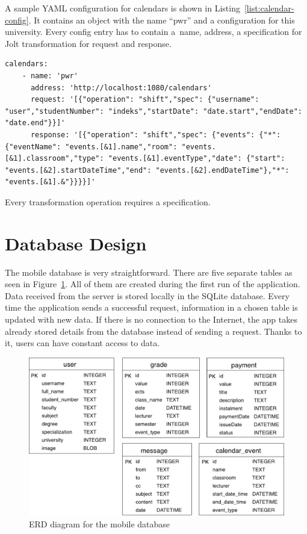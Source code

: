 A sample YAML configuration for calendars is shown in Listing~\ref{list:calendar-config}. It contains an object with the name ``pwr'' and a configuration for this university. Every config entry has to contain a~name, address, a specification for Jolt transformation for request and response.

\begin{lstlisting}[label=list:calendar-config,caption=Sample YAML configuration for calendars, basicstyle=\footnotesize\ttfamily, breaklines=true]
calendars:
    - name: 'pwr'
      address: 'http://localhost:1080/calendars'
      request: '[{"operation": "shift","spec": {"username": "user","studentNumber": "indeks","startDate": "date.start","endDate": "date.end"}}]'
      response: '[{"operation": "shift","spec": {"events": {"*": {"eventName": "events.[&1].name","room": "events.[&1].classroom","type": "events.[&1].eventType","date": {"start": "events.[&2].startDateTime","end": "events.[&2].endDateTime"},"*": "events.[&1].&"}}}}]'
\end{lstlisting}

Every transformation operation requires a specification.


\section{Database Design}
The mobile database is very straightforward. There are five separate tables as seen in Figure~\ref{fig:erd-diagram}. All of them are created during the first run of the application. Data received from the server is stored locally in the SQLite database. Every time the application sends a successful request, information in a chosen table is updated with new data. If there is no connection to the Internet, the app takes already stored details from the database instead of sending a request. Thanks to it, users can have constant access to data.
\begin{figure}[htb]
    \centering
    \includegraphics[scale=0.7]{fig03/erd_diagram.pdf}
    \caption{ERD diagram for the mobile database}
    \label{fig:erd-diagram}
\end{figure}

